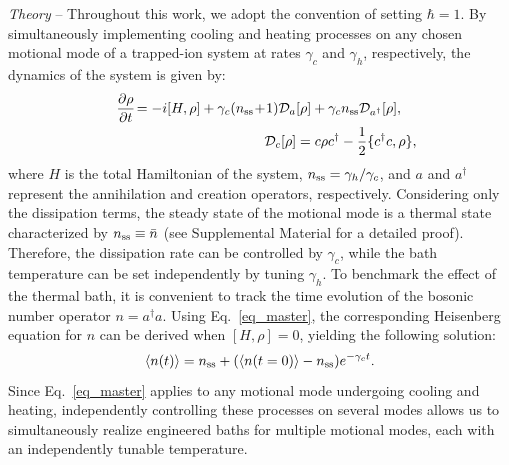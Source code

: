 \documentclass[
reprint,
superscriptaddress,

amsmath,amssymb,
aps,
prl,

floatfix,
]{revtex4-2}
\begin{document}
\emph{Theory} -- Throughout this work, we adopt the convention of setting $\hbar=1$. By simultaneously implementing cooling and heating processes on any chosen motional mode of a trapped-ion system at rates $\gamma_c$ and $\gamma_h$, respectively, the dynamics of the system is given by:
\begin{eqnarray}
    &&\frac{\partial\rho}{\partial t}\!=-i[H,\rho] +\gamma_c (n_{\rm ss}\!+\!1)\mathcal{D}_{a}[\rho] + \gamma_c n_{\rm ss} \mathcal{D}_{a^\dagger}[\rho],\;\;\;\;
    \nonumber\\
    &&\mathcal{D}_c[\rho]=c\rho c^\dagger -\frac{1}{2}\{c^\dagger c,\rho\},
    \label{eq_master}
\end{eqnarray}
where $H$ is the total Hamiltonian of the system, $n_{\rm ss}=\gamma_h/\gamma_c$, and $a$ and $a^\dagger$ represent the annihilation and creation operators, respectively. Considering only the dissipation terms, the steady state of the motional mode is a thermal state characterized by $n_{\rm ss}\equiv\bar{n}$ \cite{carmichael2013statistical} (see Supplemental Material \cite{so2025fT_supp} for a detailed proof). Therefore, the dissipation rate can be controlled by $\gamma_c$, while the bath temperature can be set independently by tuning $\gamma_h$.
To benchmark the effect of the thermal bath, it is convenient to track the time evolution of the bosonic number operator $n=a^\dagger a$. Using Eq.~\eqref{eq_master}, the corresponding Heisenberg equation for $n$ can be derived when $[H,\rho]=0$, yielding the following solution:
\begin{equation}
    \braket{n(t)} = n_{\rm ss} + (\braket{n(t=0)}- n_{\rm ss})e^{-\gamma_c t}.
    \label{eq_ndynamics}
\end{equation}
Since Eq.~\eqref{eq_master} applies to any motional mode undergoing cooling and heating, independently controlling these processes on several modes allows us to simultaneously realize engineered baths for multiple motional modes, each with an independently tunable temperature.

\iffalse
\end{document}
